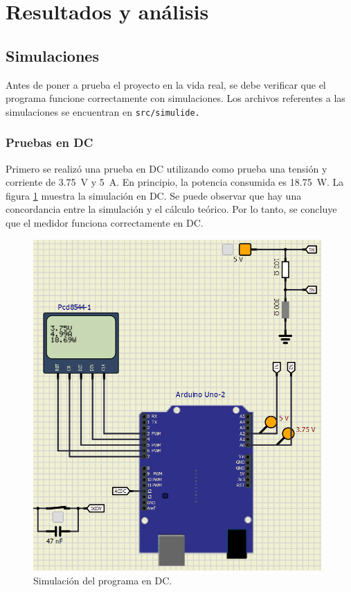 \section{Resultados y análisis}
\subsection{Simulaciones}
Antes de poner a prueba el proyecto en la vida real, se debe verificar que el programa funcione correctamente con simulaciones. Los archivos referentes a las simulaciones se encuentran en \tt{src/simulide}.
\subsubsection{Pruebas en DC}
Primero se realizó una prueba en DC utilizando como prueba una tensión y corriente de \SI{3.75}{\volt} y \SI{5}{\ampere}. En principio, la potencia consumida es \SI{18.75}{\watt}. La figura \ref{sim-dc} muestra la simulación en DC. Se puede observar que hay una concordancia entre la simulación y el cálculo teórico. Por lo tanto, se concluye que el medidor funciona correctamente en DC.
\begin{figure}[h]
    \centering
    \includegraphics[width=11cm]{Imagenes/sim-dc.png}
    \caption{Simulación del programa en DC.}
    \label{sim-dc}
\end{figure}

